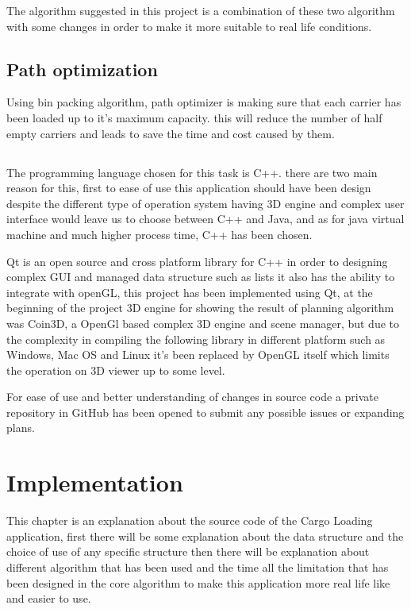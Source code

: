 \documentclass[oneside,titlepage,12pt]{memoir}
\begin{document}
The algorithm suggested in this project is a combination of these two algorithm with some changes in order to make it more suitable to real life conditions.

\section{Path optimization}

Using bin packing algorithm, path optimizer is making sure that each carrier has been loaded up to it's maximum capacity. this will reduce the number of half empty carriers and leads to save the time and cost caused by them.

\section*{}
The programming language chosen for this task is C++. there are two main reason for this, first to ease of use this application should have been design despite the different type of operation system having 3D engine and complex user interface would leave us to choose between C++ and Java, and as for java virtual machine and much higher process time, C++ has been chosen. 

Qt is an open source and cross platform library for C++ in order to designing complex GUI and managed data structure such as lists it also has the ability to integrate with openGL, this project has been implemented using Qt, at the beginning of the project 3D engine for showing the result of planning algorithm was Coin3D, a OpenGl based complex 3D engine and scene manager, but due to the complexity in compiling the following library in different platform such as Windows, Mac OS and Linux it's been replaced by OpenGL itself which limits the operation on 3D viewer up to some level.

For ease of use and better understanding of changes in source code a private repository in GitHub has been opened to submit any possible issues or expanding plans.


\chapter{Implementation}

This chapter is an explanation about the source code of the Cargo
Loading application, first there will be some explanation about the data
structure and the choice of use of any specific structure then there
will be explanation about different algorithm that has been used and the
time all the limitation that has been designed in the core algorithm to
make this application more real life like and easier to use.
\end{document}
